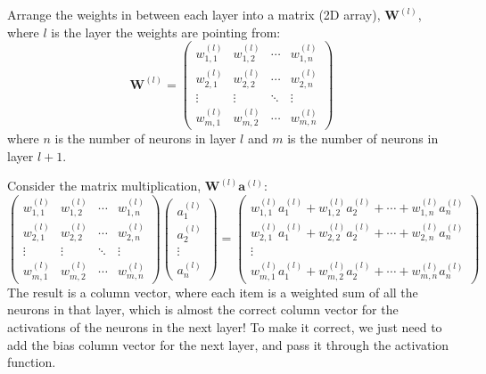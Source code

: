 \documentclass[12pt]{report}
\begin{document}
Arrange the weights in between each layer into a matrix (2D array), $\mathbf{W}^{\left(l\right)}$, where $l$ is the layer the weights are pointing from:
\begin{equation}
    \mathbf{W}^{\left(l\right)}=\begin{pmatrix}w^{\left(l\right)}_{1,1}&w^{\left(l\right)}_{1,2}&\cdots&w^{\left(l\right)}_{1,n}\\[0.3em]w^{\left(l\right)}_{2,1}&w^{\left(l\right)}_{2,2}&\cdots&w^{\left(l\right)}_{2,n}\\\vdots&\vdots&\ddots&\vdots\\w^{\left(l\right)}_{m,1}&w^{\left(l\right)}_{m,2}&\cdots&w^{\left(l\right)}_{m,n}\end{pmatrix}
\end{equation}
where $n$ is the number of neurons in layer $l$ and $m$ is the number of neurons in layer $l+1$.

Consider the matrix multiplication, $\mathbf{W}^{\left(l\right)}\mathbf{a}^{\left(l\right)}$:
\begin{equation}
    \begin{pmatrix}w^{\left(l\right)}_{1,1}&w^{\left(l\right)}_{1,2}&\cdots&w^{\left(l\right)}_{1,n}\\[0.3em]w^{\left(l\right)}_{2,1}&w^{\left(l\right)}_{2,2}&\cdots&w^{\left(l\right)}_{2,n}\\\vdots&\vdots&\ddots&\vdots\\w^{\left(l\right)}_{m,1}&w^{\left(l\right)}_{m,2}&\cdots&w^{\left(l\right)}_{m,n}\end{pmatrix}\begin{pmatrix}a^{\left(l\right)}_1\\[0.3em]a^{\left(l\right)}_2\\\vdots \\a^{\left(l\right)}_n\end{pmatrix}=\begin{pmatrix}w^{\left(l\right)}_{1,1}a^{\left(l\right)}_1+w^{\left(l\right)}_{1,2}a^{\left(l\right)}_2+\cdots +w^{\left(l\right)}_{1,n}a^{\left(l\right)}_n\\[0.3em]w^{\left(l\right)}_{2,1}a^{\left(l\right)}_1+w^{\left(l\right)}_{2,2}a^{\left(l\right)}_2+\cdots +w^{\left(l\right)}_{2,n}a^{\left(l\right)}_n\\\vdots\\w^{\left(l\right)}_{m,1}a^{\left(l\right)}_1+w^{\left(l\right)}_{m,2}a^{\left(l\right)}_2+\cdots +w^{\left(l\right)}_{m,n}a^{\left(l\right)}_n\end{pmatrix}
\end{equation}
The result is a column vector, where each item is a weighted sum of all the neurons in that layer, which is almost the correct column vector for the activations of the neurons in the next layer! To make it correct, we just need to add the bias column vector for the next layer, and pass it through the activation function.
\end{document}
